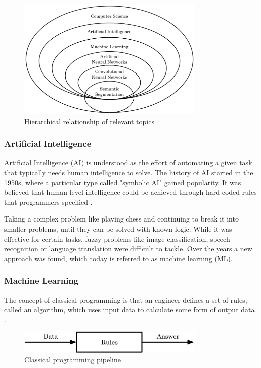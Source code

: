 \begin{figure}[H]
\centering
\par
\includegraphics[width=0.8\textwidth]{imgs/cs_hier.png}
\caption{Hierarchical relationship of relevant topics}
\par
\end{figure}

\subsubsection{Artificial Intelligence}

Artificial Intelligence (AI) is understood as the effort of automating a given task that typically needs human intelligence to solve. The history of AI started in the 1950s, where a particular type called "symbolic AI" gained popularity. It was believed that human level intelligence could be achieved through hard-coded rules that programmers specified \cite{Chollet2017}. 

Taking a complex problem like playing chess and continuing to break it into smaller problems, until they can be solved with known logic. While it was effective for certain tasks, fuzzy problems like image classification, speech recognition or language translation were difficult to tackle. Over the years a new approach was found, which today is referred to as machine learning (ML).

\subsubsection{Machine Learning}

The concept of classical programming is that an engineer defines a set of rules, called an algorithm, which uses input data to calculate some form of output data \cite{Chollet2017}.

\begin{figure}[H]
\centering
\par
\includegraphics[width=0.8\textwidth]{imgs/classic_prog.png}
\caption{Classical programming pipeline}
\par
\end{figure}

